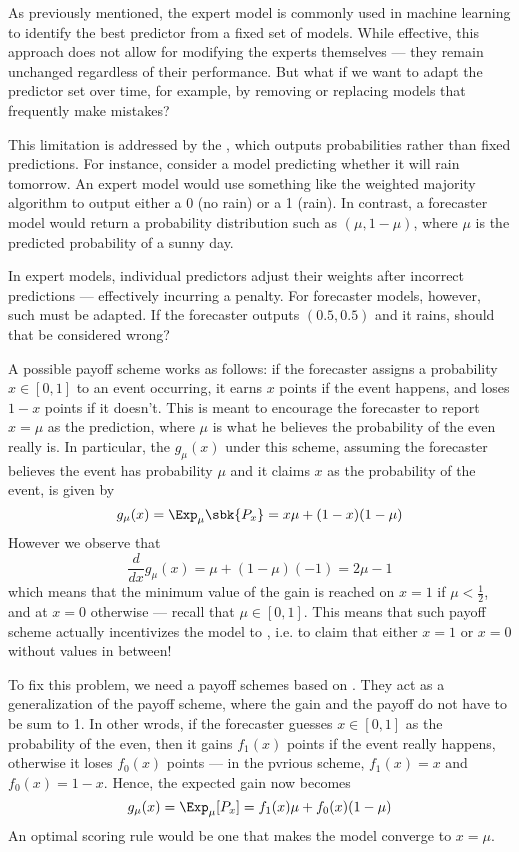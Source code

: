 \documentclass[a4paper, 12pt]{report}
\begin{document}
    As previously mentioned, the expert model is commonly used in machine learning to identify the best predictor from a fixed set of models. While effective, this approach does not allow for modifying the experts themselves --- they remain unchanged regardless of their performance. But what if we want to adapt the predictor set over time, for example, by removing or replacing models that frequently make mistakes?

    This limitation is addressed by the , which outputs probabilities rather than fixed predictions. For instance, consider a model predicting whether it will rain tomorrow. An expert model would use something like the weighted majority algorithm to output either a 0 (no rain) or a 1 (rain). In contrast, a forecaster model would return a probability distribution such as $(\mu , 1 - \mu)$, where $\mu$ is the predicted probability of a sunny day.

    In expert models, individual predictors adjust their weights after incorrect predictions --- effectively incurring a penalty. For forecaster models, however, such  must be adapted. If the forecaster outputs $(0.5, 0.5)$ and it rains, should that be considered wrong?

    A possible payoff scheme works as follows: if the forecaster assigns a probability $x \in [0,1]$ to an event occurring, it earns $x$ points if the event happens, and loses $1 - x$ points if it doesn't. This is meant to encourage the forecaster to report $x = \mu$ as the prediction, where $\mu$ is what he believes the probability of the even really is. In particular, the  $g_\mu(x)$ under this scheme, assuming the forecaster believes the event has probability $\mu$ and it claims $x$ as the probability of the event, is given by $$g_\mu(x) = \Exp_\mu \sbk{P_x} = x \mu + (1 -x )(1 - \mu)$$ However we observe that $$\dfrac{d}{dx}g_\mu(x) = \mu + (1 - \mu)(-1) = 2\mu - 1$$ which means that the minimum value of the gain is reached on $x = 1$ if $\mu < \tfrac{1}{2}$, and at $x = 0$ otherwise --- recall that $\mu \in [0, 1]$. This means that such payoff scheme actually incentivizes the model to , i.e. to claim that either $x = 1$ or $x = 0$ without values in between!

    To fix this problem, we need a payoff schemes based on . They act as a generalization of the payoff scheme, where the gain and the payoff do not have to be sum to 1. In other wrods, if the forecaster guesses $x \in [0, 1]$ as the probability of the even, then it gains $f_1(x)$ points if the event really happens, otherwise it loses $f_0(x)$ points --- in the pvrious scheme, $f_1(x) = x$ and $f_0(x) = 1- x$. Hence, the expected gain now becomes $$g_\mu(x) = \Exp_\mu[P_x] = f_1(x) \mu + f_0(x)(1 - \mu)$$ An optimal scoring rule would be one that makes the model converge to $x = \mu$.
\end{document}
